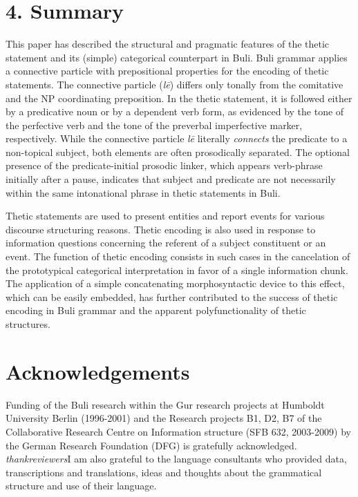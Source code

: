 \documentclass[output=paper]{langsci/langscibook}
\begin{document}
\section{4. Summary}

This paper has described the structural and pragmatic features of the thetic statement and its (simple) categorical counterpart in Buli. Buli grammar applies a connective particle with prepositional properties for the encoding of thetic statements. The connective particle (\textit{l\={e}})\textit{ }differs only tonally from the comitative and the NP coordinating preposition. In the thetic statement, it is followed either by a predicative noun or by a dependent verb form, as evidenced by the tone of the perfective verb and the tone of the preverbal imperfective marker, respectively. While the connective particle\textit{ l\={e} }literally \textit{connects} the predicate to a non-topical subject, both elements are often prosodically separated. The optional presence of the predicate-initial prosodic linker, which appears verb-phrase initially after a pause, indicates that subject and predicate are not necessarily within the same intonational phrase in thetic statements in Buli. 

Thetic statements are used to present entities and report events for various discourse structuring reasons. Thetic encoding is also used in response to information questions concerning the referent of a subject constituent or an event. The function of thetic encoding consists in such cases in the cancelation of the prototypical categorical interpretation in favor of a single information chunk. The application of a simple concatenating morphosyntactic device to this effect, which can be easily embedded, has further contributed to the success of thetic encoding in Buli grammar and the apparent polyfunctionality of thetic structures. 

\section*{ Acknowledgements }

Funding of the Buli research within the Gur research projects at Humboldt University Berlin (1996-2001) and the Research projects B1, D2, B7 of the Collaborative Research Centre on Information structure (SFB 632, 2003-2009) by the German Research Foundation (DFG) is gratefully acknowledged. \emph{\textup{thank}}\emph{\textup{reviewers}}I am also grateful to the language consultants who provided data, transcriptions and translations, ideas and thoughts about the grammatical structure and use of their language.
\end{document}
